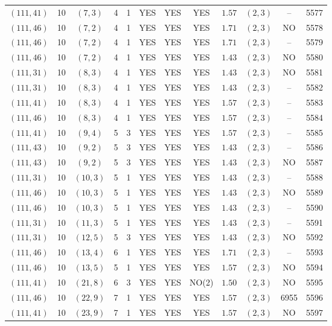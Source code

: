 \begin{longtable}{|c|c|c|c|c|c|c|c|c|c|c|c|}
$(111,41)$ & 10 & $(7,3)$ & 4 & 1 & YES & YES & YES & $1.57$ & $(2,3)$ & -- & 5577\\
$(111,46)$ & 10 & $(7,2)$ & 4 & 1 & YES & YES & YES & $1.71$ & $(2,3)$ & NO & 5578\\
$(111,46)$ & 10 & $(7,2)$ & 4 & 1 & YES & YES & YES & $1.71$ & $(2,3)$ & -- & 5579\\
$(111,46)$ & 10 & $(7,2)$ & 4 & 1 & YES & YES & YES & $1.43$ & $(2,3)$ & NO & 5580\\
$(111,31)$ & 10 & $(8,3)$ & 4 & 1 & YES & YES & YES & $1.43$ & $(2,3)$ & NO & 5581\\
$(111,31)$ & 10 & $(8,3)$ & 4 & 1 & YES & YES & YES & $1.43$ & $(2,3)$ & -- & 5582\\
$(111,41)$ & 10 & $(8,3)$ & 4 & 1 & YES & YES & YES & $1.57$ & $(2,3)$ & -- & 5583\\
$(111,46)$ & 10 & $(8,3)$ & 4 & 1 & YES & YES & YES & $1.57$ & $(2,3)$ & -- & 5584\\
$(111,41)$ & 10 & $(9,4)$ & 5 & 3 & YES & YES & YES & $1.57$ & $(2,3)$ & -- & 5585\\
$(111,43)$ & 10 & $(9,2)$ & 5 & 3 & YES & YES & YES & $1.43$ & $(2,3)$ & -- & 5586\\
$(111,43)$ & 10 & $(9,2)$ & 5 & 3 & YES & YES & YES & $1.43$ & $(2,3)$ & NO & 5587\\
$(111,31)$ & 10 & $(10,3)$ & 5 & 1 & YES & YES & YES & $1.43$ & $(2,3)$ & -- & 5588\\
$(111,46)$ & 10 & $(10,3)$ & 5 & 1 & YES & YES & YES & $1.43$ & $(2,3)$ & NO & 5589\\
$(111,46)$ & 10 & $(10,3)$ & 5 & 1 & YES & YES & YES & $1.43$ & $(2,3)$ & -- & 5590\\
$(111,31)$ & 10 & $(11,3)$ & 5 & 1 & YES & YES & YES & $1.43$ & $(2,3)$ & -- & 5591\\
$(111,31)$ & 10 & $(12,5)$ & 5 & 3 & YES & YES & YES & $1.43$ & $(2,3)$ & NO & 5592\\
$(111,46)$ & 10 & $(13,4)$ & 6 & 1 & YES & YES & YES & $1.71$ & $(2,3)$ & -- & 5593\\
$(111,46)$ & 10 & $(13,5)$ & 5 & 1 & YES & YES & YES & $1.57$ & $(2,3)$ & NO & 5594\\
$(111,41)$ & 10 & $(21,8)$ & 6 & 3 & YES & YES & NO(2) & $1.50$ & $(2,3)$ & NO & 5595\\
$(111,46)$ & 10 & $(22,9)$ & 7 & 1 & YES & YES & YES & $1.57$ & $(2,3)$ & 6955 & 5596\\
$(111,41)$ & 10 & $(23,9)$ & 7 & 1 & YES & YES & YES & $1.57$ & $(2,3)$ & NO & 5597\\

\end{longtable}
